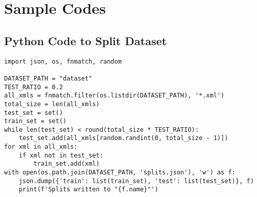 \chapter{Sample Codes}
    \section{Python Code to Split Dataset}\label{A.1}
        \begin{verbatim}
import json, os, fnmatch, random

DATASET_PATH = "dataset"
TEST_RATIO = 0.2
all_xmls = fnmatch.filter(os.listdir(DATASET_PATH), '*.xml')
total_size = len(all_xmls)
test_set = set()
train_set = set()
while len(test_set) < round(total_size * TEST_RATIO):
    test_set.add(all_xmls[random.randint(0, total_size - 1)])
for xml in all_xmls:
    if xml not in test_set:
        train_set.add(xml)
with open(os.path.join(DATASET_PATH, 'splits.json'), 'w') as f:
    json.dump({'train': list(train_set), 'test': list(test_set)}, f)
    print(f'Splits written to "{f.name}"')
        \end{verbatim}
